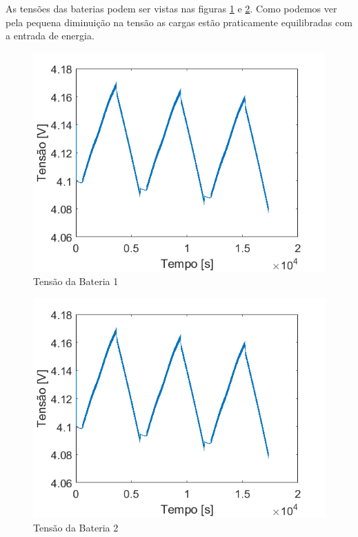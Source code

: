 As tensões das baterias podem ser vistas nas figuras \ref{figura_simulacao_tensao_bat1} e \ref{figura_simulacao_tensao_bat2}. Como podemos ver pela pequena diminuição na tensão as cargas estão praticamente equilibradas com a entrada de energia.

\begin{figure}[!htpb]
\begin{center}
\includegraphics[scale=0.5]{figures/simulatedBatteryVoltage1.png}
\caption{Tensão da Bateria 1}
\label{figura_simulacao_tensao_bat1}
\end{center}
\end{figure}

\begin{figure}[!htpb]
\begin{center}
\includegraphics[scale=0.5]{figures/simulatedBatteryVoltage2.png}
\caption{Tensão da Bateria 2}
\label{figura_simulacao_tensao_bat2}
\end{center}
\end{figure}